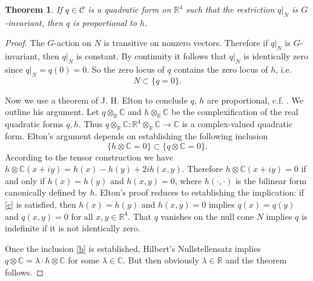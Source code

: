 \documentclass[12pt]{amsart}
\newtheorem*{thm}{Theorem}
\theoremstyle{definition}
\theoremstyle{remark}
\newcommand{\bC}{\mathbb{C}}
\newcommand{\bR}{\mathbb{R}}
\newcommand{\sC}{\mathscr{C}}
\begin{document}
\begin{thm}
If $q\in \sC$ is a quadratic form on $\bR^4$ such that the restriction $q|_N$ is $G$-invariant, then $q$ is proportional to $h$. 
\end{thm} 
\begin{proof}
The $G$-action on $N$ is transitive on nonzero vectors. Therefore if $q|_N$ is $G$-invariant, then $q|_N$ is constant. By continuity it follows that $q|_N$ is identically zero since $q|_N=q(0)=0$. So the zero locus of $q$ contains the zero locus of $h$, i.e. \begin{equation}\label{c} N\subset \{q=0\}.
\end{equation}

Now we use a theorem of J. H. Elton to conclude $q$, $h$ are proportional, c.f. \cite{elton2010indefinite}. We outline his argument. Let $q\otimes_\bR \bC$ and $h\otimes_\bR \bC$ be the complexification of the real quadratic forms $q,h$. Thus $q\otimes_\bR \bC: \bR^4 \otimes_\bR \bC \to \bC$ is a complex-valued quadratic form. Elton's argument depends on establishing the following inclusion \begin{equation}\label{b}
\{h\otimes \bC=0\} \subset \{q\otimes \bC=0\}.
\end{equation}
According to the tensor construction we have $h\otimes \bC (x+iy)=h(x)-h(y) + 2i h(x,y)$. Therefore $h\otimes \bC(x+iy)=0$ if and only if $h(x)=h(y)$ and $h(x,y)=0$, where $h(\cdot, \cdot)$ is the bilinear form canonically defined by $h$. Elton's proof reduces to establishing the implication: if \eqref{c} is satisfied, then $h(x)=h(y)$ and $h(x,y)=0$ implies $q(x)=q(y)$ and $q(x,y)=0$ for all $x,y\in \bR^4$. That $q$ vanishes on the null cone $N$ implies $q$  is indefinite if it is not identically zero.

Once the inclusion \eqref{b} is established, Hilbert's Nullstellensatz \cite{eisenbud2013commutative} implies $q\otimes \bC=\lambda \cdot h\otimes \bC$ for some $\lambda \in \bC$. But then obviously $\lambda\in \bR$ and the theorem follows.
\end{proof}
\end{document}
